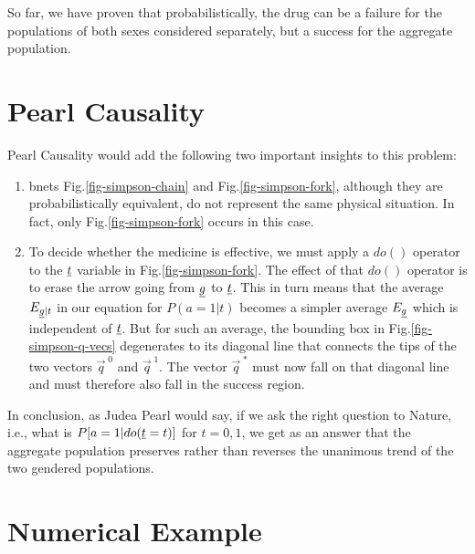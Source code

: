 So far, we have proven that probabilistically, 
the drug can be a failure for the populations
 of both sexes considered separately, 
but a success for the aggregate population.

\section*{Pearl Causality}

Pearl Causality would add 
the following two 
important insights 
to this problem:
\begin{enumerate}
\item bnets Fig.\ref{fig-simpson-chain} 
and Fig.\ref{fig-simpson-fork}, 
although they are
probabilistically equivalent, 
do not represent the same physical
 situation. In fact, only
 Fig.\ref{fig-simpson-fork} 
occurs in this case.
\item To decide whether the
 medicine is effective, we 
must apply a $do()$ operator to
 the ${\underline{t}}$ variable in
 Fig.\ref{fig-simpson-fork}. 
The effect of that $do()$ operator
 is to erase the arrow going 
from $ {\underline{g}}$ to $ {\underline{t}}$. This in turn means
 that the average $ E_{\underline{g}|t}$
 in our equation for $ P(a=1|t)$
 becomes a simpler average $ E_{\underline{g}}$
 which is independent of $ {\underline{t}}$. 
But for such an average,
 the
 bounding box in Fig.\ref{fig-simpson-q-vecs}
 degenerates to its diagonal 
line that connects the tips
 of the two vectors $ \vec{q}^{\;0}$
 and $ \vec{q}^{\;1}$. The vector 
$ \vec{q}^{\;*}$ must now fall on 
that diagonal line and must therefore
 also fall in the success region.
\end{enumerate}
In conclusion, as Judea Pearl would say,
 if we ask the right question to Nature,
 i.e., what is
 $ P[a=1 | do(\underline{t}=t)]$ for $ t=0,1$,
 we get as an answer that the 
aggregate population preserves 
rather than reverses the
 unanimous trend of the 
two gendered populations.
\newpage
\section*{Numerical Example}

